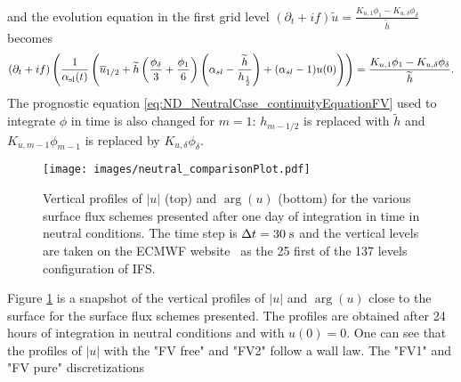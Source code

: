 and the evolution equation in the first grid level
$ (\partial_t+if) \widetilde{u}
= \frac{K_{u, 1}\phi_1 - K_{u,\delta} \phi_{\delta}}{\widetilde{h}}$
becomes
\begin{equation}
	\label{eq:ND_NeutralCase_semiDiscreteEkmanEqFVfree}
	(\partial_t+if) \left(\frac{1}{\alpha_{\rm sl}(t)}
	\left(\overline{u}_{1/2} + \widetilde{h}
	\left(\frac{\phi_{\delta}}{3} + \frac{\phi_1}{6}\right)
	\left(\alpha_{sl} - \frac{\widetilde{h}}{h_{\frac{1}{2}}}\right)
	+ (\alpha_{sl} - 1) u(0)
	\right)\right)
	= \frac{K_{u, 1}\phi_1 - K_{u,\delta} \phi_{\delta}}{\widetilde{h}}.
\end{equation}
The prognostic equation \eqref{eq:ND_NeutralCase_continuityEquationFV}
used to integrate $\phi$ in time
is also changed for $m=1$: $h_{m-1/2}$ is replaced
with $\widetilde{h}$ and $K_{u, m-1}\phi_{m-1}$ is replaced by
$K_{u,\delta}\phi_{\delta}$.
%
\begin{figure}[htpb]
	\centering
	\texttt{[image: images/neutral\_comparisonPlot.pdf]}
	\caption[Vertical profiles of $|u|$ and $\arg(u)$]
	{Vertical profiles of $|u|$ (top) and $\arg(u)$ (bottom)
	for the various surface flux schemes presented
	after one day of integration in time in neutral conditions.
	The time step is $\Delta t = 30 \;{\rm s}$
	and the vertical levels are taken
	on the ECMWF website\footnotemark ~ as the 25 first
	of the 137 levels configuration of IFS.
	}
	\label{fig:ND_NeutralCase_comparisonPlot}
\end{figure}
\par
Figure \ref{fig:ND_NeutralCase_comparisonPlot} is a snapshot of
the vertical profiles of $|u|$ and $\arg(u)$ close to the surface
for the surface flux schemes presented.
The profiles are obtained after 24 hours of integration in neutral
conditions and with $u(0) = 0$.
One can see that the profiles of $|u|$ with the "FV free" and "FV2"
follow a wall law. The "FV1" and "FV pure" discretizations
